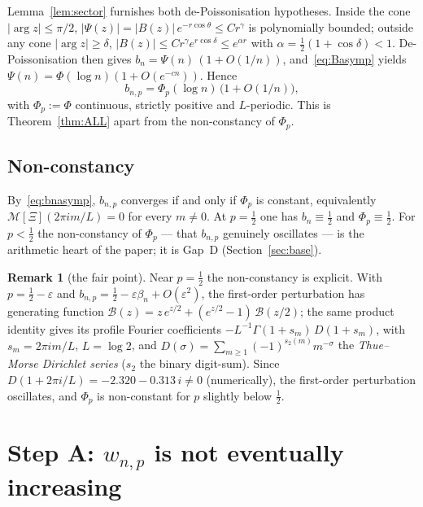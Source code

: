 \documentclass[11pt]{article}
\theoremstyle{definition}
\newtheorem{remark}[theorem]{Remark}
\begin{document}
Lemma~\ref{lem:sector} furnishes both de-Poissonisation hypotheses.
Inside the cone $|\arg z|\le\pi/2$, $|\Psi(z)|=|B(z)|\,
e^{-r\cos\theta}\le Cr^{\gamma}$ is polynomially bounded; outside any
cone $|\arg z|\ge\delta$, $|B(z)|\le Cr^{\gamma}e^{r\cos\delta}\le
e^{\alpha r}$ with $\alpha=\tfrac12(1+\cos\delta)<1$.
De-Poissonisation then gives $b_n=\Psi(n)\,(1+O(1/n))$,
and~\eqref{eq:Basymp} yields $\Psi(n)=\Phi(\log n)(1+O(e^{-cn}))$.
Hence
\begin{equation}\label{eq:bnasymp}
  b_{n,p}=\Phi_p(\log n)\,\bigl(1+O(1/n)\bigr),
\end{equation}
with $\Phi_p:=\Phi$ continuous, strictly positive and $L$-periodic.
This is Theorem~\ref{thm:ALL} apart from the non-constancy of
$\Phi_p$.

\subsection{Non-constancy}\label{sec:nonconst}

By~\eqref{eq:bnasymp}, $b_{n,p}$ converges if and only if $\Phi_p$ is
constant, equivalently $\mathcal M[\Xi](2\pi im/L)=0$ for every
$m\ne0$. At $p=\tfrac12$ one has $b_n\equiv\tfrac12$ and
$\Phi_p\equiv\tfrac12$. For $p<\tfrac12$ the non-constancy of $\Phi_p$
--- that $b_{n,p}$ genuinely oscillates --- is the arithmetic heart of
the paper; it is Gap~D (Section~\ref{sec:base}).

\begin{remark}[the fair point]
  Near $p=\tfrac12$ the non-constancy is explicit. With
  $p=\tfrac12-\varepsilon$ and $b_{n,p}=\tfrac12-\varepsilon\beta_n
  +O(\varepsilon^2)$, the first-order perturbation has generating
  function $\mathcal B(z)=z\,e^{z/2}+(e^{z/2}-1)\,\mathcal B(z/2)$;
  the same product identity gives its profile Fourier coefficients
  $-L^{-1}\Gamma(1+s_m)\,D(1+s_m)$, with $s_m=2\pi im/L$, $L=\log2$,
  and $D(\sigma)=\sum_{m\ge1}(-1)^{s_2(m)}m^{-\sigma}$ the
  \emph{Thue--Morse Dirichlet series} ($s_2$ the binary digit-sum).
  Since $D(1+2\pi i/L)=-2.320-0.313\,i\ne0$ (numerically), the
  first-order perturbation oscillates, and $\Phi_p$ is non-constant
  for $p$ slightly below $\tfrac12$.
\end{remark}

\section{Step A: \texorpdfstring{$w_{n,p}$}{w(n,p)} is not eventually
  increasing}\label{sec:A}
\end{document}
